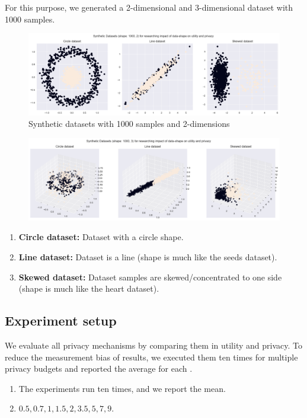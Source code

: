 For this purpose, we generated a 2-dimensional and 3-dimensional dataset with 1000 samples.
\begin{figure}[H]
    \includegraphics[width=1.0\textwidth]{Method//images/2d-shapes.png}
    \caption{Synthetic datasets with 1000 samples and 2-dimensions}
    \label{rq3:synthetic-datasets}
\end{figure}
\begin{figure}[H]
    \includegraphics[width=1.0\textwidth]{3d-shapes.png}
    \label{rq3:synthetic-datasets-3d}
\end{figure}

\begin{enumerate}
    \item \textbf{Circle dataset:} Dataset with a circle shape.
    \item \textbf{Line dataset:} Dataset is a line (shape is much like the seeds dataset).
    \item \textbf{Skewed dataset:} Dataset samples are skewed/concentrated to one side (shape is much like the heart dataset).
\end{enumerate}
\subsection{Experiment setup}
We evaluate all privacy mechanisms by comparing them in utility and privacy.
To reduce the measurement bias of results, we executed them ten times for multiple privacy budgets and reported the average for each \citep{9679364}.
\begin{enumerate}
    \item The experiments run ten times, and we report the mean.
    \item {} ${0.5, 0.7, 1, 1.5, 2, 3.5, 5, 7, 9}$.
\end{enumerate}

